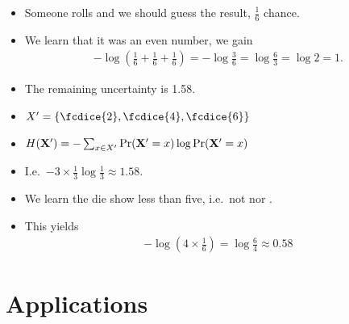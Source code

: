 \begin{frame}
  \begin{example}
    \begin{itemize}
      \item Someone rolls and we should guess the result, \(\frac{1}{6}\) 
        chance.
      \item We learn that it was an even number, we gain
        \begin{align*}
          -\log\left( \frac{1}{6} + \frac{1}{6} + \frac{1}{6}\right) =
          -\log\frac{3}{6} = \log\frac{6}{3} = \log 2 = 1.
        \end{align*}
      \item The remaining uncertainty is \SI{1.58}{\bit}.
    \end{itemize}
  \end{example}

  \pause{}

  \begin{remark}
    \begin{itemize}
      \item \(X' = \{\fcdice{2}, \fcdice{4}, \fcdice{6}\}\)
      \item \(H(\mathbf X') = - \sum_{x\in X'} \Pr(\mathbf X' = x)\log \Pr(\mathbf 
          X' = x)\)
      \item I.e.\ \(- 3 \times \frac{1}{3}\log\frac{1}{3} \approx 1.58\).
    \end{itemize}
  \end{remark}
\end{frame}

\begin{frame}
  \begin{example}
    \begin{itemize}
      \item We learn the die show less than five, i.e.\ not  nor 
        .
      \item This yields
        \begin{align*}
          -\log\left( 4\times\frac{1}{6}\right) = \log\frac{6}{4}\approx 0.58
        \end{align*}
    \end{itemize}
  \end{example}
\end{frame}


\section[Applications]{Applications}

